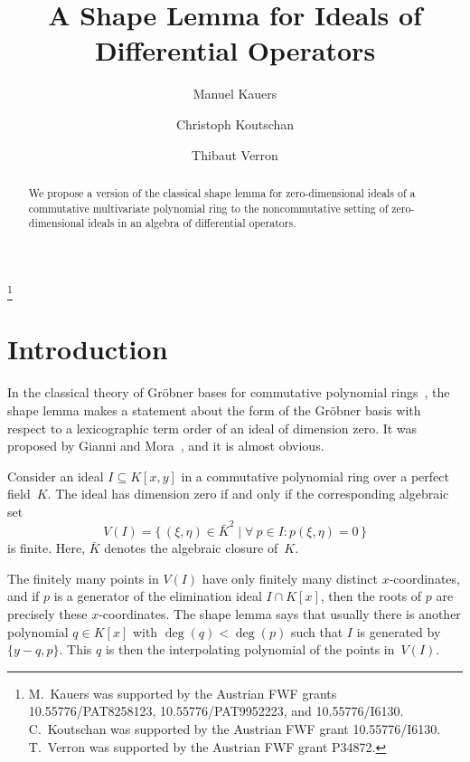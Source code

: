 \documentclass[a4paper,draft]{amsart}
\begin{document}
\author[Manuel Kauers]{Manuel Kauers}
\address{Manuel Kauers, Institute for Algebra, J. Kepler University Linz, Austria}

\author[Christoph Koutschan]{Christoph Koutschan}
\address{Christoph Koutschan, RICAM, Austrian Academy of Sciences, Linz, Austria}

\author[Thibaut Verron]{Thibaut Verron}
\address{Thibaut Verron, Institute for Algebra, J. Kepler University Linz, Austria}

\thanks{M.\ Kauers was supported by the Austrian FWF grants 10.55776/PAT8258123, 10.55776/PAT9952223,
  and 10.55776/I6130.
  C.\ Koutschan was supported by the Austrian FWF grant 10.55776/I6130.
T.\ Verron was supported by the Austrian FWF grant P34872.}  

\title{A Shape Lemma for Ideals of Differential Operators}

\begin{abstract}
  We propose a version of the classical shape lemma for zero-dimensional
  ideals of a commutative multivariate polynomial ring to
  the noncommutative setting of zero-dimensional ideals in an algebra of
  differential operators.
\end{abstract}

\maketitle

\section{Introduction}

In the classical theory of Gr\"obner bases for commutative polynomial
rings~\cite{buchberger65,cox92,becker93,cox05,buchberger10},
the shape lemma makes a statement about the form of the Gr\"obner basis with
respect to a lexicographic term order of an ideal of dimension zero.
It was proposed by Gianni and Mora~\cite{gianni89}, and it is almost obvious.

Consider an ideal $I\subseteq K[x,y]$ in a commutative polynomial ring over
a perfect field~$K$. The ideal has dimension zero if and only if the corresponding
algebraic set
\[
V(I)=\{\,(\xi,\eta)\in \bar K^2\mid\forall\ p\in I: p(\xi,\eta)=0\,\}
\]
is finite. Here, $\bar K$ denotes the algebraic closure of~$K$.

The finitely many points in $V(I)$ have only finitely many distinct $x$-coordinates,
and if $p$ is a generator of the elimination ideal $I\cap K[x]$, then the roots of
$p$ are precisely these $x$-coordinates.
The shape lemma says that usually there is another polynomial $q\in K[x]$ with
$\deg(q)<\deg(p)$ such that $I$ is generated by $\{y-q,p\}$.
This $q$ is then the interpolating polynomial of the points in~$V(I)$.
\end{document}
